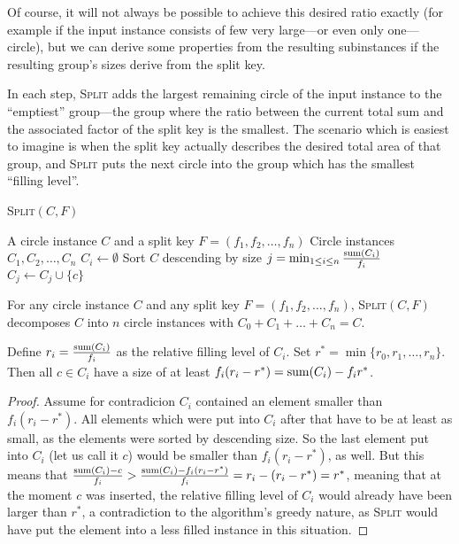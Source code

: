 \documentclass[%
    a4paper,              %
    style=screen,          %
    bibliography=totoc,   %
    nexus,                %
    lnum,                 %
    extramargin,          %
]{tubsbook}
\begin{document}
Of course, it will not always be possible to achieve this desired ratio exactly (for example if the input instance consists of few very large---or even only one---circle), but we can derive some properties from the resulting subinstances if the resulting group's sizes derive from the split key.

In each step, \textsc{Split} adds the largest remaining circle of the input instance to the “emptiest” group---the group where the ratio between the current total sum and the associated factor of the split key is the smallest. The scenario which is easiest to imagine is when the split key actually describes the desired total area of that group, and \textsc{Split} puts the next circle into the group which has the smallest “filling level”.

\begin{algorithm}[htbp!]
    \caption{\textsc{Split}$(C,F)$}
    \begin{algorithmic}
        \Require A circle instance $C$ and a split key $F = (f_1, f_2, \dots, f_n)$
        \Ensure Circle instances $C_1, C_2, \dots, C_n$
            \State $C_i \gets \emptyset$
        \EndFor
        \State Sort $C$ descending by size
            \State $j = \min_{1 \le i \le n} \frac{\operatorname{sum}(C_i)}{f_i}$
            \State $C_j \gets C_j \cup \{c\}$
        \EndFor
    \end{algorithmic}
\end{algorithm}

\begin{theorem}\label{th:split-property}
    For any circle instance $C$ and any split key $F = (f_1, f_2, \dots, f_n)$, \textsc{Split}$(C,F)$ decomposes $C$ into $n$ circle instances with $C_0 + C_1 + \dots + C_n = C$.

    Define $r_i = \frac{\operatorname{sum}(C_i)}{f_i}$ as the relative filling level of $C_i$.
    Set $r^* = \min\{r_0,r_1,\dots,r_n\}$.
    Then all $c \in C_i$ have a size of at least $f_i(r_i-r^*) = \operatorname{sum}(C_i) - f_i r^*$.
\end{theorem}

\begin{proof}
    Assume for contradicion $C_i$ contained an element smaller than $f_i(r_i-r^*)$. All elements which were put into $C_i$ after that have to be at least as small, as the elements were sorted by descending size. So the last element put into $C_i$ (let us call it $c$) would be smaller than $f_i(r_i-r^*)$, as well.
    But this means that $\frac{\operatorname{sum}(C_i) - c}{f_i} > \frac{\operatorname{sum}(C_i) - f_i(r_i-r^*)}{f_i} = r_i - (r_i-r^*) = r^*$, meaning that at the moment $c$ was inserted, the relative filling level of $C_i$ would already have been larger than $r^*$, a contradiction to the algorithm's greedy nature, as \textsc{Split} would have put the element into a less filled instance in this situation.
\end{proof}
\end{document}
